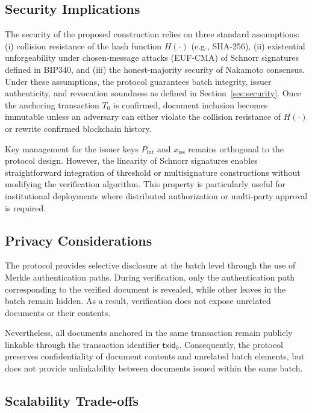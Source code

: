 \documentclass[preprint,12pt]{elsarticle}
\begin{document}
\subsection{Security Implications}

The security of the proposed construction relies on three standard assumptions: 
(i) collision resistance of the hash function $H(\cdot)$ (e.g., SHA-256), 
(ii) existential unforgeability under chosen-message attacks (EUF-CMA) of Schnorr signatures defined in BIP340, 
and (iii) the honest-majority security of Nakamoto consensus.
Under these assumptions, the protocol guarantees batch integrity, issuer authenticity, and revocation soundness as defined in Section~\ref{sec:security}. 
Once the anchoring transaction $T_0$ is confirmed, document inclusion becomes immutable unless an adversary can either violate the collision resistance of $H(\cdot)$ or rewrite confirmed blockchain history.

Key management for the issuer keys $P_{\mathrm{int}}$ and $x_{\mathrm{iss}}$ remains orthogonal to the protocol design. 
However, the linearity of Schnorr signatures enables straightforward integration of threshold or multisignature constructions without modifying the verification algorithm. 
This property is particularly useful for institutional deployments where distributed authorization or multi-party approval is required.

\subsection{Privacy Considerations}

The protocol provides selective disclosure at the batch level through the use of Merkle authentication paths. 
During verification, only the authentication path corresponding to the verified document is revealed, while other leaves in the batch remain hidden. 
As a result, verification does not expose unrelated documents or their contents.

Nevertheless, all documents anchored in the same transaction remain publicly linkable through the transaction identifier $\mathsf{txid}_0$. 
Consequently, the protocol preserves confidentiality of document contents and unrelated batch elements, but does not provide unlinkability between documents issued within the same batch.



\subsection{Scalability Trade-offs}
\end{document}
